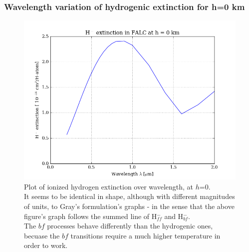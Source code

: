 \documentclass[11pt,a4paper,notitlepage]{article}
\begin{document}
\subsubsection{Wavelength variation of hydrogenic extinction for h=0 km}
\begin{figure}[H]
\center

	\includegraphics[scale=0.42]{../figs/2cont_ext_gray.png}
	\caption{Plot of ionized hydrogen extinction over wavelength, at $h$=0.\\
	It seems to be identical in shape, although with different magnitudes of units, to Gray's formulation's graphs - in the sense that the above figure's graph follows the summed line of H$^-_{ff}$ and H$^-_{bf}$.\\
	The $bf$ processes behave differently than the hydrogenic ones, becuase the $bf$ transitions require a much higher temperature in order to work.}
\end{figure}
\end{document}
